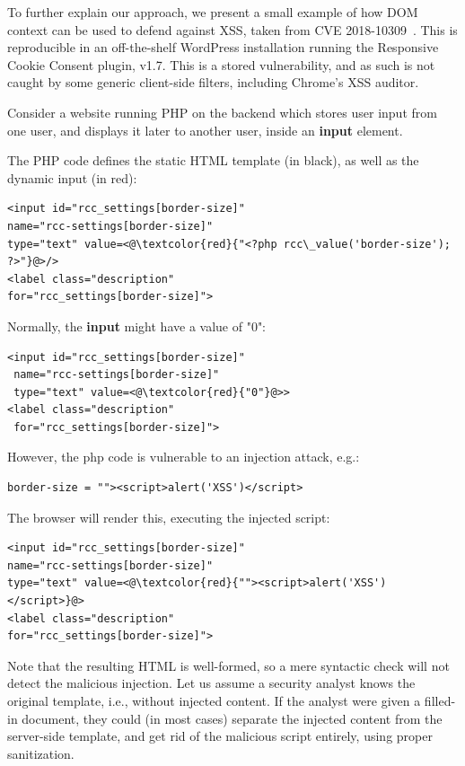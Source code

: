 To further explain our approach, we present a small example of how
DOM context can be used to defend against XSS, taken from CVE
2018-10309~\cite{examplecve}. This is reproducible in an off-the-shelf
WordPress installation running the Responsive Cookie Consent plugin,
v1.7. This is a stored \xss vulnerability, and as such is not caught
by some generic client-side \xss filters, including Chrome's XSS auditor.

Consider a website running PHP on the backend which stores user input
from one user, and displays it later to another user, inside an \textbf{input} element.

The PHP code defines the static HTML template (in black), as well as the dynamic input (in red):
\begin{lstlisting}
<input id="rcc_settings[border-size]" 
name="rcc-settings[border-size]" 
type="text" value=<@\textcolor{red}{"<?php rcc\_value('border-size'); ?>"}@>/>
<label class="description"
for="rcc_settings[border-size]">
\end{lstlisting}
Normally, the \textbf{input} might have a value of "0":
\begin{lstlisting}
<input id="rcc_settings[border-size]" 
 name="rcc-settings[border-size]" 
 type="text" value=<@\textcolor{red}{"0"}@>>
<label class="description"
 for="rcc_settings[border-size]">
\end{lstlisting}
However, the php code is vulnerable to an injection attack, e.g.:
\begin{lstlisting}
border-size = ""><script>alert('XSS')</script>
\end{lstlisting}
The browser will render this, executing the injected script:
\begin{lstlisting}
<input id="rcc_settings[border-size]" 
name="rcc-settings[border-size]" 
type="text" value=<@\textcolor{red}{""><script>alert('XSS')</script>}@>
<label class="description"
for="rcc_settings[border-size]">
\end{lstlisting}

Note that the resulting HTML is well-formed, so a mere syntactic check
will not detect the malicious injection. Let us assume a security
analyst knows the original template, i.e., without injected
content. If the analyst were given a filled-in document, they could
(in most cases) separate the injected content from the server-side
template, and get rid of the malicious script entirely, using proper sanitization. %

